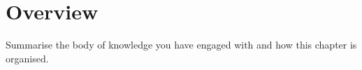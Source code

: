 \section{Overview}
\label{sec:learnt-overview}


Summarise the body of knowledge you have engaged with and how this
chapter is organised.
